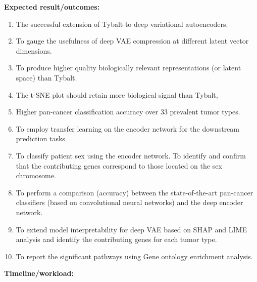 \documentclass[12pt]{exam}
\begin{document}
\begin{flushleft}\textbf{Expected result/outcomes:}\end{flushleft}
\begin{enumerate}
        \item The successful extension of Tybalt to deep variational autoencoders.
	\item To gauge the usefulness of deep VAE compression at different latent vector dimensions. 
	\item To produce higher quality biologically relevant representations (or latent space) than Tybalt. 
	\item The t-SNE plot should retain more biological signal than Tybalt,
	\item Higher pan-cancer classification accuracy over 33 prevalent tumor types.
	\item To employ transfer learning on the encoder network for the downstream prediction tasks.
	\item To classify patient sex using the encoder network. To identify and confirm that the contributing genes correspond to those located on the sex chromosome.
	\item To perform a comparison (accuracy) between the state-of-the-art pan-cancer classifiers (based on convolutional neural networks) and the deep encoder network.
	\item To extend model interpretability for deep VAE based on SHAP and LIME analysis and identify the contributing genes for each tumor type.
\item To report the significant pathways using Gene ontology enrichment analysis.
\end{enumerate}
\break
\begin{flushleft}\textbf{Timeline/workload:}\end{flushleft}
\end{document}
